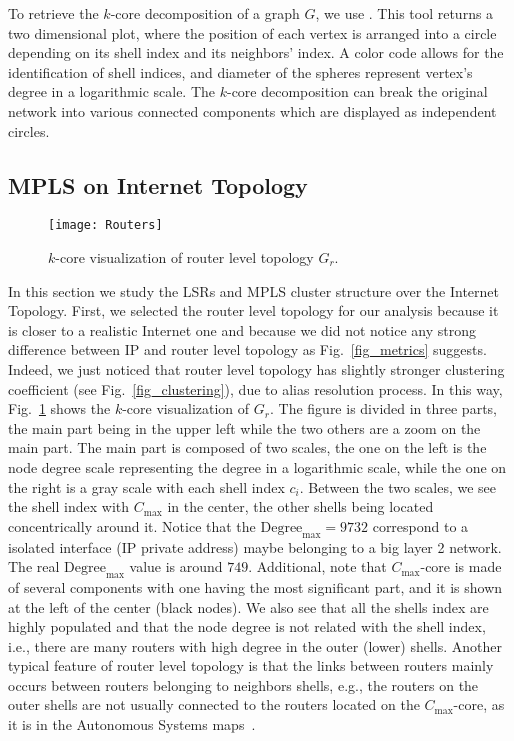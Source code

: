 To retrieve the $k$-core decomposition of a graph $G$, we use
\lanet\cite{Alvarez06k}.  
This tool returns a two dimensional plot, where the position of each vertex is arranged into a circle
depending on its shell index and its neighbors' index. A color code allows for the identification of shell indices, and diameter of the spheres represent vertex's degree in a logarithmic scale. 
The $k$-core decomposition can break the original network into various connected components which are displayed as independent circles.

\subsection{MPLS on Internet Topology}\label{cluster.topo}
\begin{figure}[!t]
  \begin{center}
    \texttt{[image: Routers]}
  \end{center}
  \caption{$k$-core visualization of router level topology $G_{r}$.}
  \label{fig_k_core_routers}
\end{figure}

In this section we study the LSRs and MPLS cluster structure over
the Internet Topology.  First, we selected the router level topology
for our analysis because it is closer to a realistic Internet one and
because  we did not notice any strong difference between IP and router level topology
as Fig.~\ref{fig_metrics} suggests. Indeed, we just noticed that router level topology has slightly stronger clustering coefficient (see Fig.~\ref{fig_clustering}), due to alias resolution process.
In this way, Fig.~\ref{fig_k_core_routers} shows the $k$-core visualization of $G_{r}$.  The
figure is divided in three parts, the main part being in the upper left while
the two others are a zoom on the main part.  The main part is composed of two
scales, the one on the left is the node degree scale representing the degree in
a logarithmic scale, while the one on the right is a gray scale with each shell
index $c_i$. Between the two scales, we see the shell index with $C_{\max}$ in
the center, the other shells being located concentrically around it. Notice that the
$\text{Degree}_{\max}=9732$ correspond to a isolated interface (IP private address) maybe belonging to a
big layer 2 network. The real $\text{Degree}_{\max}$ value is around $749$. Additional, note that
$C_{\max}$-core is made of several components with one having the most
significant part, and it is shown at the left of the center (black nodes).  We
also see that all the shells index are highly populated and that the node degree
is not related with the shell index, i.e., there are many routers with high
degree in the outer (lower) shells.  Another typical feature of router level
topology is that the links between routers mainly occurs between routers
belonging to neighbors shells, e.g., the routers on the outer shells are not
usually connected to the routers located on the  $C_{\max}$-core, as it is in
the Autonomous Systems maps~\cite{Alvarez06k}.

